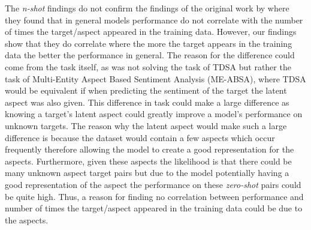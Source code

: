 The \textit{n-shot} findings do not confirm the findings of the original work by \citet{yang2018multi} where they found that in general models performance do not correlate with the number of times the target/aspect appeared in the training data. However, our findings show that they do correlate where the more the target appears in the training data the better the performance in general. The reason for the difference could come from the task itself, as \citet{yang2018multi} was not solving the task of TDSA but rather the task of Multi-Entity Aspect Based Sentiment Analysis (ME-ABSA), where TDSA would be equivalent if when predicting the sentiment of the target the latent aspect was also given. This difference in task could make a large difference as knowing a target's latent aspect could greatly improve a model's performance on unknown targets. The reason why the latent aspect would make such a large difference is because the dataset would contain a few aspects which occur frequently therefore allowing the model to create a good representation for the aspects. Furthermore, given these aspects the likelihood is that there could be many unknown aspect target pairs but due to the model potentially having a good representation of the aspect the performance on these \textit{zero-shot} pairs could be quite high. Thus, a reason for \citet{yang2018multi} finding no correlation between performance and number of times the target/aspect appeared in the training data could be due to the aspects.

%
%

